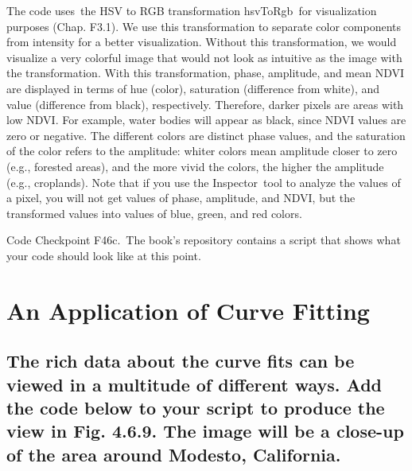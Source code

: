 \documentclass[
  letterpaper,
  DIV=11,
  numbers=noendperiod]{scrreprt}
\begin{document}
The code uses~the HSV to RGB transformation hsvToRgb~for visualization
purposes (Chap. F3.1). We use this transformation to separate color
components from intensity for a better visualization. Without this
transformation, we would visualize a very colorful image that would not
look as intuitive as the image with the transformation. With this
transformation, phase, amplitude, and mean NDVI are displayed in terms
of hue (color), saturation (difference from white), and value
(difference from black), respectively. Therefore, darker pixels are
areas with low NDVI. For example, water bodies will appear as black,
since NDVI values are zero or negative. The different colors are
distinct phase values, and the saturation of the color refers to the
amplitude: whiter colors mean amplitude closer to zero (e.g., forested
areas), and the more vivid the colors, the higher the amplitude (e.g.,
croplands). Note that if you use the Inspector~tool to analyze the
values of a pixel, you will not get values of phase, amplitude, and
NDVI, but the transformed values into values of blue, green, and red
colors.

\begin{tcolorbox}[enhanced jigsaw, left=2mm, breakable, rightrule=.15mm, opacityback=0, colframe=quarto-callout-note-color-frame, colbacktitle=quarto-callout-note-color!10!white, arc=.35mm, opacitybacktitle=0.6, toptitle=1mm, colback=white, leftrule=.75mm, title=\textcolor{quarto-callout-note-color}{\faInfo}\hspace{0.5em}{Note}, toprule=.15mm, bottomtitle=1mm, titlerule=0mm, bottomrule=.15mm, coltitle=black]

Code Checkpoint F46c.~The book's repository contains a script that shows
what your code should look like at this point.

\end{tcolorbox}

\hypertarget{an-application-of-curve-fitting}{%
\section{An Application of Curve
Fitting}\label{an-application-of-curve-fitting}}

\hypertarget{the-rich-data-about-the-curve-fits-can-be-viewed-in-a-multitude-of-different-ways.-add-the-code-below-to-your-script-to-produce-the-view-in-fig.-4.6.9.-the-image-will-be-a-close-up-of-the-area-around-modesto-california.}{%
\subsection{The rich data about the curve fits can be viewed in a
multitude of different ways. Add the code below to your script to
produce the view in Fig. 4.6.9. The image will be a close-up of the area
around Modesto,
California.}\label{the-rich-data-about-the-curve-fits-can-be-viewed-in-a-multitude-of-different-ways.-add-the-code-below-to-your-script-to-produce-the-view-in-fig.-4.6.9.-the-image-will-be-a-close-up-of-the-area-around-modesto-california.}}
\end{document}
